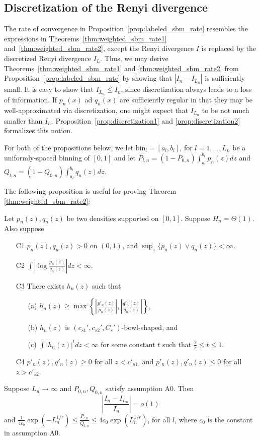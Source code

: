 \documentclass{article}
\newcommand{\bin}{\text{bin}}
\begin{document}
\subsection{Discretization of the Renyi divergence}
\label{sec:discretization_analysis}

The rate of convergence in Proposition~\ref{prop:labeled_sbm_rate} resembles the expressions in Theorems~\ref{thm:weighted_sbm_rate1} and~\ref{thm:weighted_sbm_rate2}, except the Renyi divergence $I$ is replaced by the discretized Renyi divergence $I_L$. Thus, we may derive Theorems~\ref{thm:weighted_sbm_rate1} and \ref{thm:weighted_sbm_rate2} from Proposition~\ref{prop:labeled_sbm_rate} by showing that $|I_n-I_{L_n}|$ is sufficiently small. It is easy to show that $I_{L_n} \leq I_n$, since discretization always leads to a loss of information. If $p_n(x)$ ad $q_n(x)$ are sufficiently regular in that they may be well-approximated via discretization, one might expect that $I_{L_n}$ to be not much smaller than $I_n$. Proposition~\ref{prop:discretization1} and \ref{prop:discretization2} formalizes this notion.
\medskip


For both of the propositions below, we let $\bin_l = [a_l, b_l]$, for $l=1, \dots, L_n$ be a uniformly-spaced binning of $[0,1]$ and let $P_{l,n} = (1- P_{0,n}) \int_{a_l}^{b_l} p_n(z) dz$ and $Q_{l,n} = (1-Q_{0,n})\int_{a_l}^{b_l} q_n(z) dz$.


\noindent The following proposition is useful for proving Theorem \ref{thm:weighted_sbm_rate2}:

\begin{proposition}
\label{prop:discretization2}
Let $p_n(z), q_n(z)$ be two densities supported on $[0,1]$. Suppose $H_n = \Theta(1)$. Also suppose
\begin{enumerate}
\item[C1]  $p_n(z), q_n(z) > 0$ on $(0, 1)$, and $\sup_z \{p_n(z) \vee q_n(z)\} < \infty$. 
\item[C2] $\int \left| \log \frac{p_n(z)}{q_n(z)} \right| dz < \infty$.
\item[C3]  There exists $h_n(z)$ such that
\begin{itemize}
\item[(a)] $h_n(z) \geq \max \left\{  \left|\frac{p'_n(z)}{p_n(z)} \right|, \left|\frac{q'_n(z)}{q_n(z)}\right|  \right\}$,
\item[(b)] $h_n(z)$ is $(c_{s1}', c_{s2}', C_s')$-bowl-shaped, and
\item[(c)] $\int |h_n(z)|^t dz < \infty$ for some constant $t$ such that  $\frac{2}{r} \le t \le 1$.
\end{itemize}
\item[C4]  $p'_n(z), q'_n(z) \geq 0$ for all $z < c'_{s1}$, and $p'_n(z), q'_n(z) \leq 0$ for all $z > c'_{s2}$.
\end{enumerate}
Suppose $L_n \rightarrow \infty$ and $P_{0,n}, Q_{0,n}$ satisfy assumption A0.
Then
$$ \left| \frac{I_n - I_{L_n}}{I_n} \right| = o(1)$$ 
and $\frac{1}{4c_0} \exp(-L_n^{1/r}) \leq \frac{P_{l,n}}{Q_{l,n}} \leq 4 c_0 \exp(L_n^{1/r})$, for all $l$, where $c_0$ is the constant in assumption A0.
\end{proposition}
\end{document}
